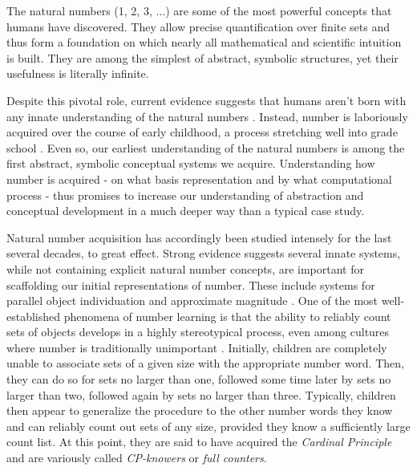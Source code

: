 \documentclass[10pt,letterpaper]{article}
\begin{document}
The natural numbers (1, 2, 3, $\ldots$) are some of the most powerful
concepts that humans have discovered. They allow precise
quantification over finite sets and thus form a foundation on which
nearly all mathematical and scientific intuition is built. They are
among the simplest of abstract, symbolic structures, yet their
usefulness is literally infinite.

Despite this pivotal role, current evidence suggests that humans
aren't born with any innate understanding of the natural numbers
\citep{Car2009}. Instead, number is laboriously acquired over the
course of early childhood, a process stretching well into grade school
\citep{Nat2010}. Even so, our earliest understanding of the natural
numbers is among the first abstract, symbolic conceptual systems we
acquire. Understanding how number is acquired - on what basis
representation and by what computational process - thus promises to
increase our understanding of abstraction and conceptual development
in a much deeper way than a typical case study.

Natural number acquisition has accordingly been studied intensely for
the last several decades, to great effect. Strong evidence suggests
several innate systems, while not containing explicit natural number
concepts, are important for scaffolding our initial representations of
number. These include systems for parallel object individuation and
approximate magnitude \citep{feigenson2004core}. One of the most
well-established phenomena of number learning is that the ability to
reliably count sets of objects develops in a highly stereotypical
process, even among cultures where number is traditionally unimportant
\citep{Wyn1992,JarPianSpelEtAl2014}. Initially, children are
completely unable to associate sets of a given size with the
appropriate number word. Then, they can do so for sets no larger than
one, followed some time later by sets no larger than two, followed
again by sets no larger than three. Typically, children then appear to
generalize the procedure to the other number words they know and can
reliably count out sets of any size, provided they know a sufficiently
large count list. At this point, they are said to have acquired the
\emph{Cardinal Principle} and are variously called \emph{CP-knowers}
or \emph{full counters}.
\end{document}
